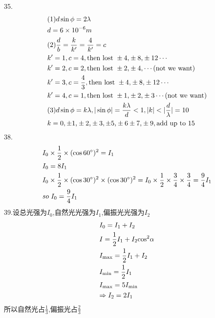 \documentclass{article}
\begin{document}
35.\[\begin{gathered}
(1)d\sin \phi  = 2\lambda  \hfill \\
d = 6 \times {10^{ - 6}}m \hfill \\
(2)\frac{d}{b} = \frac{k}{{k'}} = \frac{4}{{k'}} = c \hfill \\
k' = 1,c = 4,{\text{then lost }} \pm 4{\text{,}} \pm 8{\text{,}} \pm 1{\text{2}} \cdots  \hfill \\
k' = 2,c = 2,{\text{then lost }} \pm 2{\text{,}} \pm 4{\text{,}} \cdots ({\text{not we want}}) \hfill \\
k' = 3,c = \frac{4}{3},{\text{then lost }} \pm 4{\text{,}} \pm 8{\text{,}} \pm 1{\text{2}} \cdots  \hfill \\
k' = 4,c = 1,{\text{then lost }} \pm 1{\text{,}} \pm 2{\text{,}} \pm 3 \cdots ({\text{not we want}}) \hfill \\
(3)d\sin \phi  = k\lambda ,|\sin \phi | = \frac{{k\lambda }}{d} < 1,|k| < |\frac{d}{\lambda }| = 10 \hfill \\
k = 0, \pm 1{\text{,}} \pm 2{\text{,}} \pm 3, \pm 5{\text{,}} \pm 6 \pm 7{\text{,}} \pm 9,{\text{add up to 15}} \hfill \\ 
\end{gathered} \]
38.\[\begin{gathered}
{I_0} \times \frac{1}{2} \times {(\cos {60^ \circ })^2} = {I_1} \hfill \\
{I_0} = 8{I_1} \hfill \\
{I_0} \times \frac{1}{2} \times {(\cos {30^ \circ })^2} \times {(\cos {30^ \circ })^2} = {I_0} \times \frac{1}{2} \times \frac{3}{4} \times \frac{3}{4} = \frac{9}{4}{I_1} \hfill \\
so{\kern 1pt} {\kern 1pt} {\kern 1pt} {I_0} = \frac{9}{4}{I_1} \hfill \\ 
\end{gathered} \]
39.设总光强为$I_0$,自然光光强为$I_1$,偏振光光强为$I_2$\\
\[\begin{gathered}
{I_0} = {I_1} + {I_2} \hfill \\
I = \frac{1}{2}{I_1} + {I_2}{\cos ^2}\alpha  \hfill \\
{I_{\max }} = \frac{1}{2}{I_1} + {I_2} \hfill \\
{I_{\min }} = \frac{1}{2}{I_1} \hfill \\
{I_{\max }} = 5{I_{\min }} \hfill \\
\Rightarrow {I_2} = 2{I_1} \hfill \\ 
\end{gathered} \]
所以自然光占$\frac{1}{3}$,偏振光占$\frac{2}{3}$
\end{document}
